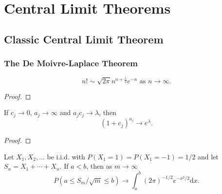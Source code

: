 \chapter{Central Limit Theorems}


\section{Classic Central Limit Theorem}

\subsection{The De Moivre-Laplace Theorem}

\begin{lemma} \label{lem:stirling}
    \begin{equation}
        n ! \sim \sqrt{2 \pi} n^{n+\frac{1}{2}} e^{-n} \text{ as } n \rightarrow \infty.
    \end{equation}
\end{lemma}

\begin{proof}

\end{proof}

\begin{lemma} \label{lem:exp}
    If $c_j\rightarrow 0$, $a_j\rightarrow\infty$ and $a_jc_j\rightarrow\lambda$, then
    \begin{equation}
        \left(1+c_j\right)^{a_j}\rightarrow e^\lambda.
    \end{equation}
\end{lemma}

\begin{proof}

\end{proof}

\begin{theorem} \label{thm:de-moivre-laplace}
    Let $X_{1}, X_{2}, \ldots$ be i.i.d. with $P\left(X_{1}=1\right)=P\left(X_{1}=-1\right)=1 / 2$ and let $S_{n}=X_{1}+\cdots+X_{n}$. If $a<b$, then as $m \rightarrow \infty$
    \begin{equation}
        P\left(a \leq S_{m} / \sqrt{m} \leq b\right) \rightarrow \int_{a}^{b}(2 \pi)^{-1 / 2} e^{-x^{2} / 2} \mathrm{d} x.
    \end{equation}
\end{theorem}

